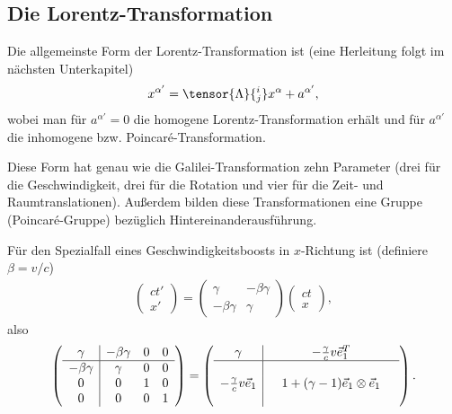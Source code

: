 \subsection{Die Lorentz-Transformation}

Die allgemeinste Form der Lorentz-Transformation ist (eine Herleitung folgt im nächsten Unterkapitel)
\begin{align*}
    x^{\alpha'}=\tensor{\Lambda}{^i_j}x^\alpha+a^{\alpha'},
\end{align*}
wobei man für $a^{\alpha'}=0$ die homogene Lorentz-Transformation erhält und für $a^{\alpha'}$ die inhomogene bzw. Poincaré-Transformation.

Diese Form hat genau wie die Galilei-Transformation zehn Parameter (drei für die Geschwindigkeit, drei für die Rotation und vier für die Zeit- und Raumtranslationen).
Außerdem bilden diese Transformationen eine Gruppe (Poincaré-Gruppe) bezüglich Hintereinanderausführung.

Für den Spezialfall eines Geschwindigkeitsboosts in $x$-Richtung ist (definiere $\beta=v/c$)
\begin{align*}
    \begin{pmatrix}ct' \\ x' \end{pmatrix} = \begin{pmatrix}\gamma&-\beta\gamma \\ -\beta\gamma &\gamma \end{pmatrix} \begin{pmatrix}ct \\ x \end{pmatrix},
\end{align*}
also
\begin{align*}
    \left(\begin{array}{c|ccc}
              \gamma       & -\beta\gamma & 0 & 0 \\
              \hline
              -\beta\gamma & \gamma       & 0 & 0 \\
              0            & 0            & 1 & 0 \\
              0            & 0            & 0 & 1
          \end{array}\right)
    =\left(\begin{array}{c|ccc}
               \gamma                      &  & -\frac{\gamma}{c}v\vec{e}_1^T           & \\
               \hline
                                           &  &                                         & \\
               -\frac{\gamma}{c}v\vec{e}_1 &  & 1 + (\gamma-1)\vec{e}_1\otimes\vec{e}_1 & \\
                                           &  &                                         &
           \end{array}\right).
\end{align*}

